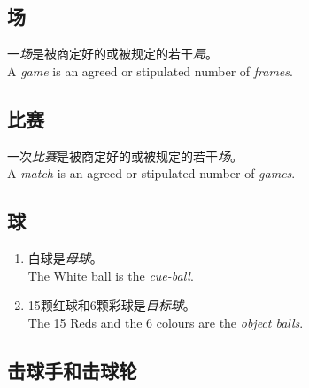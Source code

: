 \subsection{场}

\noindent 一\emph{场}是被商定好的或被规定的若干\emph{局}。\\
A \emph{game} is an agreed or stipulated number of \emph{frames}.

\subsection{比赛}

\noindent 一次\emph{比赛}是被商定好的或被规定的若干\emph{场}。\\
A \emph{match} is an agreed or stipulated number of \emph{games}.

\subsection{球}

\begin{enumerate}[label=(\alph*)]
    \item 白球是\emph{母球}。\\
    The White ball is the \emph{cue-ball}.
    \item 15颗红球和6颗彩球是\emph{目标球}。\\
    The 15 Reds and the 6 colours are the \emph{object balls}.
\end{enumerate}

\subsection{击球手和击球轮}

